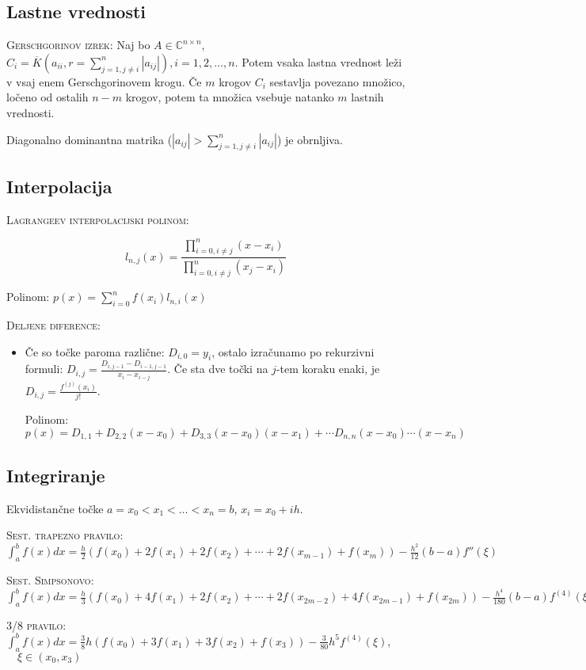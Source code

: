 \documentclass[a4paper,10pt]{article}
\theoremstyle{definition}
\def\C{\mathbb{C}}
\begin{document}
\subsection*{Lastne vrednosti}

\textsc{Gerschgorinov izrek:} Naj bo $A \in \C ^{n\times n}$, $C_i =
\overline{K}(a_{ii}, r=\sum_{j=1, j \neq i}^n | a_{ij}|), i=1,2,\ldots ,n$.
Potem vsaka lastna vrednost leži v vsaj enem Gerschgorinovem krogu. Če $m$
krogov $C_i$ sestavlja povezano množico, ločeno od ostalih $n-m$ krogov, potem
ta množica vsebuje natanko $m$ lastnih vrednosti.

Diagonalno dominantna matrika ($|a_{ij}| > \sum_{j=1, j\neq i}^n|a_{ij}|$) je obrnljiva.

\subsection*{Interpolacija}

\textsc{Lagrangeev interpolacijski polinom:}

$$l_{n,j}(x)=\frac{\prod_{i=0,i\neq j}^n(x-x_i)}{\prod_{i=0,i\neq j}^n(x_j-x_i)}$$

Polinom: $p(x) = \sum_{i=0}^nf(x_i)l_{n,i}(x)$

\textsc{Deljene diference:}

\begin{itemize}

\item Če so točke paroma različne: $D_{i,0} = y_i$, ostalo izračunamo po
rekurzivni formuli: $D_{i,j} = \frac{D_{i,j-1}-D_{i-1,j-1}}{x_i-x_{i-j}}$. Če
sta dve točki na $j$-tem koraku enaki, je $D_{i,j} = \frac{f^{(j)}(x_i)}{j!}$.

Polinom: $p(x) = D_{1,1} + D_{2,2}(x-x_0) + D_{3,3}(x-x_0)(x-x_1) + \cdots D_{n,n}(x-x_0)\cdots (x-x_n)$

\end{itemize}

\subsection*{Integriranje}

Ekvidistančne točke $a = x_0 < x_1 < \dots < x_n = b$, $x_i = x_0 + ih$.

\textsc{Sest. trapezno pravilo:} $\int_{a}^{b} f(x) dx = \frac{h}{2} (f(x_0)+2f(x_1)
+2f(x_2)+\cdots + 2f(x_{m-1})+f(x_m))-\frac{h^2}{12}(b-a)f''(\xi)$

\textsc{Sest. Simpsonovo:} $\int_{a}^{b} f(x) dx = \frac{h}{3} (f(x_0)+4f(x_1)
+2f(x_2)+\cdots + 2f(x_{2m-2})+4f(x_{2m-1})+f(x_{2m}))-\frac{h^4}{180}(b-a)f^{(4)}(\xi)$

\textsc{3/8 pravilo:} $\int_a^b f(x) dx = \frac{3}{8} h(f(x_0) + 3f(x_1)
+ 3f(x_2) + f(x_3)) - \frac{3}{80} h^5f^{(4)}(\xi )$, $\quad \xi \in (x_0,x_3)$
\end{document}
